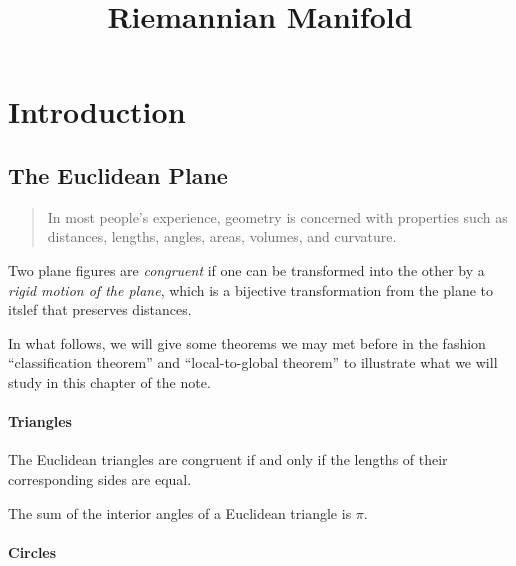 


\title{Riemannian Manifold}
\label{chapter-riemannian-manifold}

\tableofcontents

\section{Introduction}
\label{section-Introduction}

\subsection{The Euclidean Plane}
\label{subsection-introduction-the-Euclidean-plane}

\begin{quote}
  In most people's experience, geometry is concerned with properties such as distances, lengths, angles, areas, volumes, and curvature.
\end{quote}

\begin{definition}
  \label{definition-congruent}
  \label{definition-rigid-motion}
  Two plane figures are \emph{congruent} if one can be transformed into the other by a \emph{rigid motion of the plane}, which is a bijective transformation from the plane to itslef that preserves distances.
\end{definition}

In what follows, we will give some theorems we may met before in the fashion ``classification theorem'' and ``local-to-global theorem'' to illustrate what we will study in this chapter of the note.

\paragraph{Triangles}

\begin{theorem}
  \label{theorem-side-side-side}
  The Euclidean triangles are congruent if and only if the lengths of their corresponding sides are equal.
\end{theorem}

\begin{theorem}
  \label{theorem-angle-sum}
  The sum of the interior angles of a Euclidean triangle is \( \pi \).
\end{theorem}

\paragraph{Circles}

